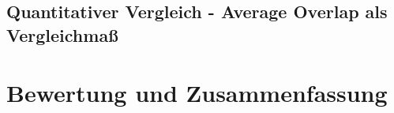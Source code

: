 \section{Quantitativer Vergleich - Average Overlap als Vergleichma\ss}




\chapter{Bewertung und Zusammenfassung}



\nocite{*}%
 


